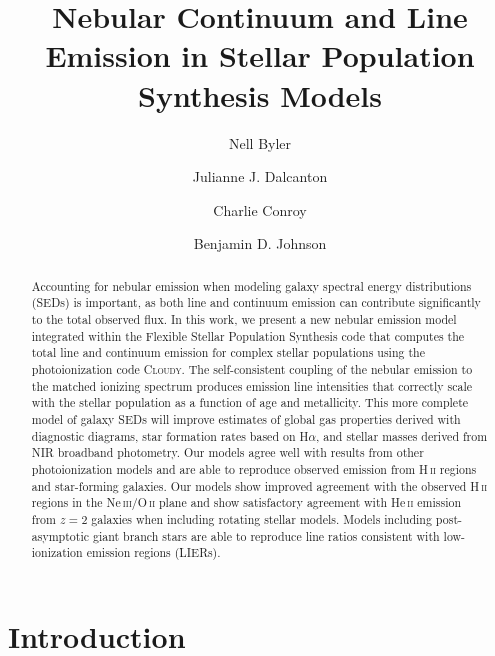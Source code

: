 \documentclass[twocolumn, tighten]{aastex61}
\begin{document}
\title{Nebular Continuum and Line Emission in Stellar Population Synthesis Models}


\author[0000-0002-7392-3637]{Nell Byler}

\author[0000-0002-1264-2006]{Julianne J. Dalcanton}

\author[0000-0002-1590-8551]{Charlie Conroy}

\author{Benjamin D. Johnson}

\begin{abstract}
Accounting for nebular emission when modeling galaxy spectral energy distributions (SEDs) is important, as both line and continuum emission can contribute significantly to the total observed flux. In this work, we present a new nebular emission model integrated within the Flexible Stellar Population Synthesis code that computes the total line and continuum emission for complex stellar populations using the photoionization code \textsc{Cloudy}. The self-consistent coupling of the nebular emission to the matched ionizing spectrum produces emission line intensities that correctly scale with the stellar population as a function of age and metallicity. This more complete model of galaxy SEDs will improve estimates of global gas properties derived with diagnostic diagrams, star formation rates based on H$\alpha$, and stellar masses derived from NIR broadband photometry. Our models agree well with results from other photoionization models and are able to reproduce observed emission from H\,\textsc{ii} regions and star-forming galaxies. Our models show improved agreement with the observed H\,\textsc{ii} regions in the Ne\,\textsc{iii}/O\,\textsc{ii} plane and show satisfactory agreement with He\,\textsc{ii} emission from $z=2$ galaxies when including rotating stellar models. Models including post-asymptotic giant branch stars are able to reproduce line ratios consistent with low-ionization emission regions (LIERs).
\end{abstract}

\section{Introduction} \label{sec:introduction}
\end{document}
